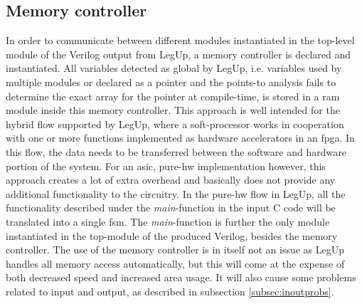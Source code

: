 \subsection{\label{subsec:memctrl}Memory controller}
In order to communicate between different modules instantiated in the top-level module of the Verilog output from LegUp, a memory controller is declared and instantiated. All variables detected as global by LegUp, i.e. variables used by multiple modules or declared as a pointer and the points-to analysis fails to determine the exact array for the pointer at compile-time, is stored in a \gls{ram} module inside this memory controller. This approach is well intended for the hybrid flow supported by LegUp, where a soft-processor works in cooperation with one or more functions implemented as hardware accelerators in an \gls{fpga}. In this flow, the data needs to be transferred between the software and hardware portion of the system. For an \gls{asic}, pure-\gls{hw} implementation however, this approach creates a lot of extra overhead and basically does not provide any additional functionality to the circuitry. In the pure-\gls{hw} flow in LegUp, all the functionality described under the \textit{main}-function in the input C code will be translated into a single \gls{fsm}. The \textit{main}-function is further the only module instantiated in the top-module of the produced Verilog, besides the memory controller. The use of the memory controller is in itself not an issue as LegUp handles all memory access automatically, but this will come at the expense of both decreased speed and increased area usage. It will also cause some problems related to input and output, as described in subsection \ref{subsec:inoutprobs}.

